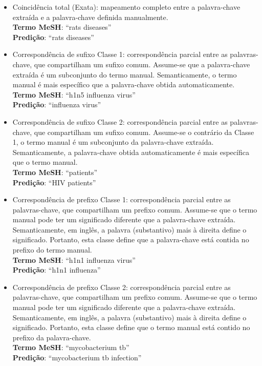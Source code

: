\begin{itemize}
    \item Coincidência total (Exata): mapeamento completo entre a palavra-chave extraída e a palavra-chave definida manualmente.\\
            \textbf{Termo MeSH}: “rats diseases”\\
            \textbf{Predição}: “rats diseases”
            
    \item Correspondência de sufixo Classe 1: correspondência parcial entre as palavras-chave, que compartilham um sufixo comum. Assume-se que a palavra-chave extraída é um subconjunto do termo manual. Semanticamente, o termo manual é mais específico que a palavra-chave obtida automaticamente.\\
\textbf{Termo MeSH}: “h1n5 influenza virus”\\
\textbf{Predição}: “influenza virus”
    
    \item Correspondência de sufixo Classe 2: correspondência parcial entre as palavras-chave, que compartilham um sufixo comum. Assume-se o contrário da Classe 1, o termo manual é um subconjunto da palavra-chave extraída. Semanticamente, a palavra-chave obtida automaticamente é mais específica que o termo manual.  \\
\textbf{Termo MeSH}: “patients”\\
\textbf{Predição}: “HIV patients”

    \item Correspondência de prefixo Classe 1: correspondência parcial entre as palavras-chave, que compartilham um prefixo comum. Assume-se que o termo manual pode ter um significado diferente que a palavra-chave extraída. Semanticamente, em inglês, a palavra (substantivo) mais à direita define o significado. Portanto, esta classe define que a palavra-chave está contida no prefixo do termo manual.\\
\textbf{Termo MeSH}: “h1n1 influenza virus”\\
\textbf{Predição}: “h1n1 influenza”

    \item Correspondência de prefixo Classe 2: correspondência parcial entre as palavras-chave, que compartilham um prefixo comum. Assume-se que o termo manual pode ter um significado diferente que a palavra-chave extraída. Semanticamente, em inglês, a palavra (substantivo) mais à direita define o significado. Portanto, esta classe define que o termo manual está contido no prefixo da palavra-chave.\\
\textbf{Termo MeSH}: “mycobacterium tb” \\
\textbf{Predição}: “mycobacterium tb infection”


\end{itemize}
